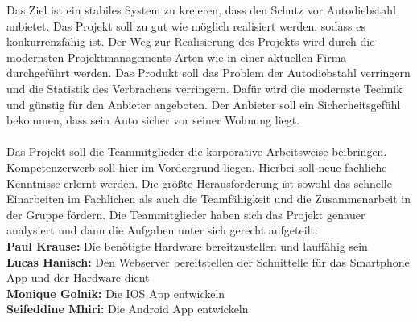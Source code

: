 
Das Ziel ist ein stabiles System zu kreieren, dass den Schutz vor Autodiebstahl anbietet. Das Projekt soll zu gut wie möglich realisiert werden, sodass es konkurrenzfähig ist. 
Der Weg zur Realisierung des Projekts wird durch die modernsten Projektmanagements Arten wie in einer aktuellen Firma durchgeführt werden. 
Das Produkt soll das Problem der Autodiebstahl verringern und die Statistik des Verbrachens verringern. Dafür wird die modernste Technik und günstig für den Anbieter angeboten.
 Der Anbieter soll ein Sicherheitsgefühl bekommen, dass sein Auto sicher vor seiner Wohnung liegt.\\\\
Das Projekt soll die Teammitglieder die korporative Arbeitsweise beibringen. 
Kompetenzerwerb soll hier im Vordergrund liegen. Hierbei soll neue fachliche Kenntnisse erlernt werden.
Die größte Herausforderung ist sowohl das schnelle Einarbeiten im Fachlichen als auch die Teamfähigkeit und die Zusammenarbeit in der Gruppe fördern.
Die Teammitglieder haben sich das Projekt genauer analysiert und dann die Aufgaben unter sich gerecht aufgeteilt:\\
\textbf{Paul Krause:} Die benötigte Hardware bereitzustellen und lauffähig sein\\
\textbf{Lucas Hanisch:} Den Webserver bereitstellen der Schnittelle für das Smartphone App und der Hardware dient\\
\textbf{Monique Golnik:} Die IOS App entwickeln\\
\textbf{Seifeddine Mhiri:} Die Android App entwickeln\\